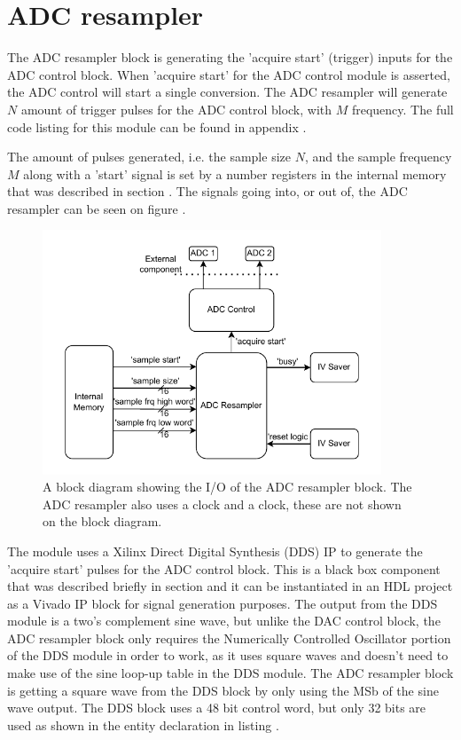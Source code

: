 \section{ADC resampler} \label{subsec:ADCResampler}
The ADC resampler block is generating the 'acquire start' (trigger) inputs for the ADC control block. When 'acquire start' for the ADC control module is asserted, the ADC control will start a single conversion. The ADC resampler will generate $N$ amount of trigger pulses for the ADC control block, with $M$ frequency. The full code listing for this module can be found in appendix .

The amount of pulses generated, i.e. the sample size $N$, and the sample frequency $M$ along with a 'start' signal is set by a number registers in the internal memory that was described in section . The signals going into, or out of, the ADC resampler can be seen on figure .

\begin{figure}[H]
    \centering
    \includegraphics[clip, trim=0 0 0 0, width=0.9\textwidth]{Sections/7_SystemDesign/Figures/7_2_10_Resample_IO.pdf}
    \caption{A block diagram showing the I/O of the ADC resampler block. The ADC resampler also uses a  clock and a  clock, these are not shown on the block diagram.}
    \label{fig:7_2_10_RESAMPLE_IO}
\end{figure}

The module uses a Xilinx Direct Digital Synthesis (DDS) IP\cite{XILINXDDS} to generate the 'acquire start' pulses for the ADC control block. This is a black box component that was described briefly in section  and it can be instantiated in an HDL project as a Vivado IP block for signal generation purposes. The output from the DDS module is a two's complement sine wave, but unlike the DAC control block, the ADC resampler block only requires the Numerically Controlled Oscillator portion of the DDS module in order to work, as it uses square waves and doesn't need to make use of the sine loop-up table in the DDS module. The ADC resampler block is getting a square wave from the DDS block by only using the MSb of the sine wave output. The DDS block uses a 48 bit control word, but only 32 bits are used as shown in the entity declaration in listing .

